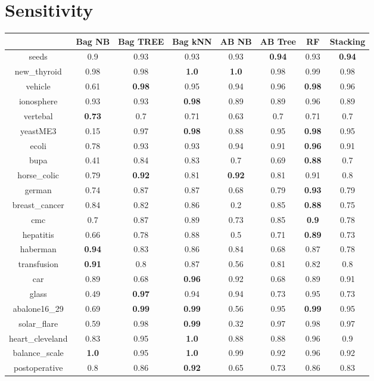 \documentclass{article}%
\begin{document}
%
\section*{Sensitivity}%
\begin{tabular}{c|ccccccc}%
&Bag NB&Bag TREE&Bag kNN&AB NB&AB Tree&RF&Stacking\\%
\hline%
seeds&0.9&0.93&0.93&0.93&\textbf{0.94}&0.93&\textbf{0.94}\\%
new\_thyroid&0.98&0.98&\textbf{1.0}&\textbf{1.0}&0.98&0.99&0.98\\%
vehicle&0.61&\textbf{0.98}&0.95&0.94&0.96&\textbf{0.98}&0.96\\%
ionosphere&0.93&0.93&\textbf{0.98}&0.89&0.89&0.96&0.89\\%
vertebal&\textbf{0.73}&0.7&0.71&0.63&0.7&0.71&0.7\\%
yeastME3&0.15&0.97&\textbf{0.98}&0.88&0.95&\textbf{0.98}&0.95\\%
ecoli&0.78&0.93&0.93&0.94&0.91&\textbf{0.96}&0.91\\%
bupa&0.41&0.84&0.83&0.7&0.69&\textbf{0.88}&0.7\\%
horse\_colic&0.79&\textbf{0.92}&0.81&\textbf{0.92}&0.81&0.91&0.8\\%
german&0.74&0.87&0.87&0.68&0.79&\textbf{0.93}&0.79\\%
breast\_cancer&0.84&0.82&0.86&0.2&0.85&\textbf{0.88}&0.75\\%
cmc&0.7&0.87&0.89&0.73&0.85&\textbf{0.9}&0.78\\%
hepatitis&0.66&0.78&0.88&0.5&0.71&\textbf{0.89}&0.73\\%
haberman&\textbf{0.94}&0.83&0.86&0.84&0.68&0.87&0.78\\%
transfusion&\textbf{0.91}&0.8&0.87&0.56&0.81&0.82&0.8\\%
car&0.89&0.68&\textbf{0.96}&0.92&0.68&0.89&0.91\\%
glass&0.49&\textbf{0.97}&0.94&0.94&0.73&0.95&0.73\\%
abalone16\_29&0.69&\textbf{0.99}&\textbf{0.99}&0.56&0.95&\textbf{0.99}&0.95\\%
solar\_flare&0.59&0.98&\textbf{0.99}&0.32&0.97&0.98&0.97\\%
heart\_cleveland&0.83&0.95&\textbf{1.0}&0.88&0.88&0.96&0.9\\%
balance\_scale&\textbf{1.0}&0.95&\textbf{1.0}&0.99&0.92&0.96&0.92\\%
postoperative&0.8&0.86&\textbf{0.92}&0.65&0.73&0.86&0.83\\%
\end{tabular}
\end{document}
